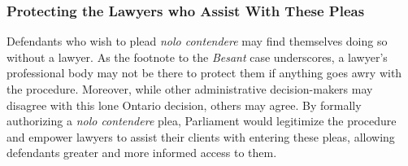\subsubsection{Protecting the Lawyers who Assist With These Pleas}

Defendants who wish to plead \textit{nolo contendere} may find themselves doing so without a lawyer. As the footnote to the \textit{Besant} case underscores, a lawyer's professional body may not be there to protect them if anything goes awry with the procedure. Moreover, while other administrative decision-makers may disagree with this lone Ontario decision, others may agree. By formally authorizing a \textit{nolo contendere} plea, Parliament would legitimize the procedure and empower lawyers to assist their clients with entering these pleas, allowing defendants greater and more informed access to them.